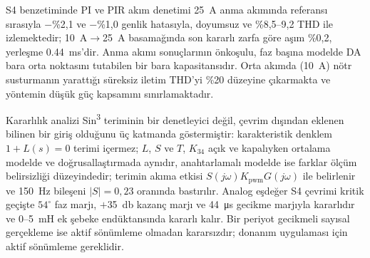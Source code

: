 S4 benzetiminde PI ve PIR akım denetimi \SI{25}{\ampere} anma akımında referansı sırasıyla $-$\%2,1 ve $-$\%1,0 genlik hatasıyla, doyumsuz ve \%8,5--9,2 THD ile izlemektedir; \SI{10}{\ampere}$\rightarrow$\SI{25}{\ampere} basamağında son kararlı zarfa göre aşım \%0,2, yerleşme \SI{0.44}{\milli\second}'dir. Anma akımı sonuçlarının önkoşulu, faz başına modelde DA bara orta noktasını tutabilen bir bara kapasitansıdır. Orta akımda (\SI{10}{\ampere}) nötr susturmanın yarattığı süreksiz iletim THD'yi \%20 düzeyine çıkarmakta ve yöntemin düşük güç kapsamını sınırlamaktadır.

Kararlılık analizi Sin\textsuperscript{3} teriminin bir denetleyici değil, çevrim dışından eklenen bilinen bir giriş olduğunu üç katmanda göstermiştir: karakteristik denklem $1+L(s)=0$ terimi içermez; $L$, $S$ ve $T$, $K_{34}$ açık ve kapalıyken ortalama modelde ve doğrusallaştırmada aynıdır, anahtarlamalı modelde ise farklar ölçüm belirsizliği düzeyindedir; terimin akıma etkisi $S(j\omega)K_{\mathrm{pwm}}G(j\omega)$ ile belirlenir ve \SI{150}{\hertz} bileşeni $|S|=0{,}23$ oranında bastırılır. Analog eşdeğer S4 çevrimi kritik geçişte $54^{\circ}$ faz marjı, $+$\SI{35}{\decibel} kazanç marjı ve \SI{44}{\micro\second} gecikme marjıyla kararlıdır ve 0--\SI{5}{\milli\henry} ek şebeke endüktansında kararlı kalır. Bir periyot gecikmeli sayısal gerçekleme ise aktif sönümleme olmadan kararsızdır; donanım uygulaması için aktif sönümleme gereklidir.

